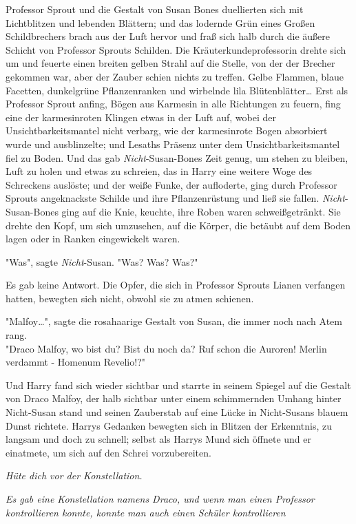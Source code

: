 {Professor Sprout und die Gestalt von Susan Bones duellierten sich mit Lichtblitzen und lebenden Blättern; und das lodernde Grün eines Großen Schildbrechers brach aus der Luft hervor und fraß sich halb durch die äußere Schicht von Professor Sprouts Schilden. Die Kräuterkundeprofessorin drehte sich um und feuerte einen breiten gelben Strahl auf die Stelle, von der der Brecher gekommen war, aber der Zauber schien nichts zu treffen. Gelbe Flammen, blaue Facetten, dunkelgrüne Pflanzenranken und wirbelnde lila Blütenblätter… Erst als Professor Sprout anfing, Bögen aus Karmesin in alle Richtungen zu feuern, fing eine der karmesinroten Klingen etwas in der Luft auf, wobei der Unsichtbarkeitsmantel nicht verbarg, wie der karmesinrote Bogen absorbiert wurde und ausblinzelte; und Lesaths Präsenz unter dem Unsichtbarkeitsmantel fiel zu Boden. Und das gab \emph{Nicht}-Susan-Bones Zeit genug, um stehen zu bleiben, Luft zu holen und etwas zu schreien, das in Harry eine weitere Woge des Schreckens auslöste; und der weiße Funke, der aufloderte, ging durch Professor Sprouts angeknackste Schilde und ihre Pflanzenrüstung und ließ sie fallen. \emph{Nicht}-Susan-Bones ging auf die Knie, keuchte, ihre Roben waren schweißgetränkt. Sie drehte den Kopf, um sich umzusehen, auf die Körper, die betäubt auf dem Boden lagen oder in Ranken eingewickelt waren.

"Was", sagte \emph{Nicht}-Susan. "Was? Was? Was?"

Es gab keine Antwort. Die Opfer, die sich in Professor Sprouts Lianen verfangen hatten, bewegten sich nicht, obwohl sie zu atmen schienen.

"Malfoy…", sagte die rosahaarige Gestalt von Susan, die immer noch nach Atem rang.\\ "Draco Malfoy, wo bist du? Bist du noch da? Ruf schon die Auroren! Merlin verdammt - Homenum Revelio!?"

Und Harry fand sich wieder sichtbar und starrte in seinem Spiegel auf die Gestalt von Draco Malfoy, der halb sichtbar unter einem schimmernden Umhang hinter Nicht-Susan stand und seinen Zauberstab auf eine Lücke in Nicht-Susans blauem Dunst richtete. Harrys Gedanken bewegten sich in Blitzen der Erkenntnis, zu langsam und doch zu schnell; selbst als Harrys Mund sich öffnete und er einatmete, um sich auf den Schrei vorzubereiten.

\emph{Hüte dich vor der Konstellation.}

\emph{Es gab eine Konstellation namens Draco, und wenn man einen Professor kontrollieren konnte, konnte man auch einen Schüler kontrollieren}

}
